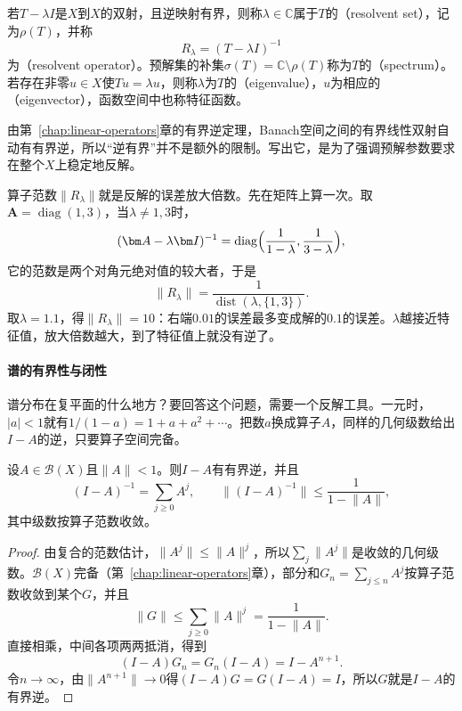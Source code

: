 \begin{definition}[谱与预解集]
\label{def:ospec-spectrum}
若$T-\lambda I$是$X$到$X$的双射，且逆映射有界，则称$\lambda\in\mathbb C$属于$T$的（resolvent set），记为$\rho(T)$，并称
\begin{equation}
R_\lambda=(T-\lambda I)^{-1}
\label{eq:ospec-resolvent}
\end{equation}
为（resolvent operator）。预解集的补集$\sigma(T)=\mathbb C\setminus\rho(T)$称为$T$的（spectrum）。若存在非零$u\in X$使$Tu=\lambda u$，则称$\lambda$为$T$的（eigenvalue），$u$为相应的（eigenvector），函数空间中也称特征函数。
\end{definition}

由第~\ref{chap:linear-operators}章的有界逆定理，Banach空间之间的有界线性双射自动有有界逆，所以“逆有界”并不是额外的限制。写出它，是为了强调预解参数要求在整个$X$上稳定地反解。

算子范数$\lVert R_\lambda\rVert$就是反解的误差放大倍数。先在矩阵上算一次。取$\bm A=\operatorname{diag}(1,3)$，当$\lambda\neq1,3$时，
\[
(\bm A-\lambda\bm I)^{-1}=\operatorname{diag}\Bigl(\frac1{1-\lambda},\frac1{3-\lambda}\Bigr),
\]
它的范数是两个对角元绝对值的较大者，于是
\[
\lVert R_\lambda\rVert=\frac{1}{\operatorname{dist}(\lambda,\{1,3\})}.
\]
取$\lambda=1.1$，得$\lVert R_\lambda\rVert=10$：右端$0.01$的误差最多变成解的$0.1$的误差。$\lambda$越接近特征值，放大倍数越大，到了特征值上就没有逆了。

\paragraph{谱的有界性与闭性}
谱分布在复平面的什么地方？要回答这个问题，需要一个反解工具。一元时，$\lvert a\rvert<1$就有$1/(1-a)=1+a+a^2+\cdots$。把数$a$换成算子$A$，同样的几何级数给出$I-A$的逆，只要算子空间完备。

\begin{lemma}[小扰动的可逆性]
\label{lem:ospec-neumann}
设$A\in\mathcal B(X)$且$\lVert A\rVert<1$。则$I-A$有有界逆，并且
\begin{equation}
(I-A)^{-1}=\sum_{j\geq0}A^j,\qquad\lVert(I-A)^{-1}\rVert\leq\frac1{1-\lVert A\rVert},
\label{eq:ospec-neumann}
\end{equation}
其中级数按算子范数收敛。
\end{lemma}

\begin{proof}
由复合的范数估计，$\lVert A^j\rVert\leq\lVert A\rVert^j$，所以$\sum_j\lVert A^j\rVert$是收敛的几何级数。$\mathcal B(X)$完备（第~\ref{chap:linear-operators}章），部分和$G_n=\sum_{j\leq n}A^j$按算子范数收敛到某个$G$，并且
\[
\lVert G\rVert\leq\sum_{j\geq0}\lVert A\rVert^j=\frac1{1-\lVert A\rVert}.
\]
直接相乘，中间各项两两抵消，得到
\[
(I-A)G_n=G_n(I-A)=I-A^{n+1}.
\]
令$n\to\infty$，由$\lVert A^{n+1}\rVert\to0$得$(I-A)G=G(I-A)=I$，所以$G$就是$I-A$的有界逆。
\end{proof}

